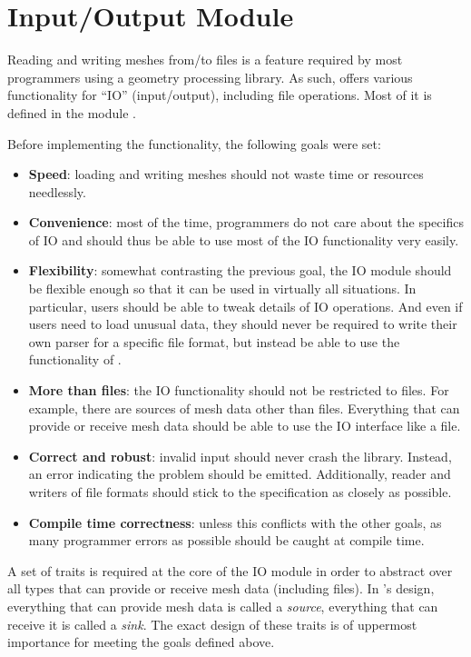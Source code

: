 \section{Input/Output Module}
\label{chap:io}

Reading and writing meshes from/to files is a feature required by most programmers using a geometry processing library.
As such,  offers various functionality for \enquote{IO} (input/output), including file operations.
Most of it is defined in the module .

Before implementing the functionality, the following goals were set:

\begin{itemize}
  \item \textbf{Speed}: loading and writing meshes should not waste time or resources needlessly.
  \item \textbf{Convenience}: most of the time, programmers do not care about the specifics of IO and should thus be able to use most of the IO functionality very easily.
  \item \textbf{Flexibility}: somewhat contrasting the previous goal, the IO module should be flexible enough so that it can be used in virtually all situations.
  In particular, users should be able to tweak details of IO operations.
  And even if users need to load unusual data, they should never be required to write their own parser for a specific file format, but instead be able to use the functionality of .
  \item \textbf{More than files}: the IO functionality should not be restricted to files.
  For example, there are sources of mesh data other than files.
  Everything that can provide or receive mesh data should be able to use the IO interface like a file.
  \item \textbf{Correct and robust}: invalid input should never crash the library.
  Instead, an error indicating the problem should be emitted.
  Additionally, reader and writers of file formats should stick to the specification as closely as possible.
  \item \textbf{Compile time correctness}: unless this conflicts with the other goals, as many programmer errors as possible should be caught at compile time.
\end{itemize}

\vfill
A set of traits is required at the core of the IO module in order to abstract over all types that can provide or receive mesh data (including files).
In 's design, everything that can provide mesh data is called a \emph{source}, everything that can receive it is called a \emph{sink}.
The exact design of these traits is of uppermost importance for meeting the goals defined above.

